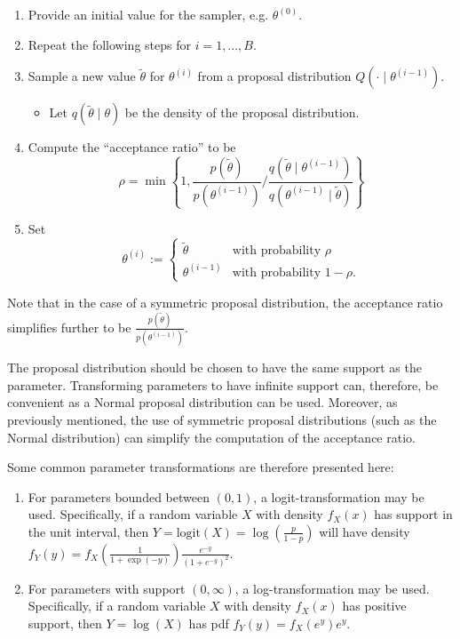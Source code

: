 \documentclass[12pt,]{article}
\providecommand{\tightlist}{%
  \setlength{\itemsep}{0pt}\setlength{\parskip}{0pt}}
\newcommand{\p}[1]{\left(#1\right)}
\newcommand{\bc}[1]{ \left\{#1\right\} }
\def\logit{\text{logit}}
\begin{document}
\begin{enumerate}
\def\labelenumi{\arabic{enumi}.}
\tightlist
\item
  Provide an initial value for the sampler, e.g. \(\theta^{(0)}\).
\item
  Repeat the following steps for \(i = 1,...,B\).
\item
  Sample a new value \(\tilde\theta\) for \(\theta^{(i)}\) from a
  proposal distribution \(Q(\cdot \mid \theta^{(i-1)})\).

  \begin{itemize}
  \tightlist
  \item
    Let \(q(\tilde\theta \mid \theta)\) be the density of the proposal
    distribution.
  \end{itemize}
\item
  Compute the ``acceptance ratio'' to be \[
     \rho=
     \min\bc{1, \frac{p(\tilde\theta)}{p(\theta^{(i-1)})} \Big/ 
            \frac{q(\tilde\theta\mid\theta^{(i-1)})}
                 {q(\theta^{(i-1)}\mid\tilde\theta)}
        }
     \]
\item
  Set \[
     \theta^{(i)} := 
     \begin{cases}
     \tilde\theta &\text{with probability } \rho \\
     \theta^{(i-1)} &\text{with probability } 1-\rho.
     \end{cases}
     \]
\end{enumerate}

Note that in the case of a symmetric proposal distribution, the
acceptance ratio simplifies further to be
\(\frac{p(\tilde\theta)}{p(\theta^{(i-1)})}\).

The proposal distribution should be chosen to have the same support as
the parameter. Transforming parameters to have infinite support can,
therefore, be convenient as a Normal proposal distribution can be used.
Moreover, as previously mentioned, the use of symmetric proposal
distributions (such as the Normal distribution) can simplify the
computation of the acceptance ratio.

Some common parameter transformations are therefore presented here:

\begin{enumerate}
\def\labelenumi{\arabic{enumi}.}
\tightlist
\item
  For parameters bounded between \((0,1)\), a logit-transformation may
  be used. Specifically, if a random variable \(X\) with density
  \(f_X(x)\) has support in the unit interval, then
  \(Y=\logit(X)=\log\p{\frac{p}{1-p}}\) will have density
  \(f_Y(y) = f_X\p{\frac{1}{1+\exp(-y)}}\frac{e^{-y}}{(1+e^{-y})^{2}}\).
\item
  For parameters with support \((0,\infty)\), a log-transformation may
  be used. Specifically, if a random variable \(X\) with density
  \(f_X(x)\) has positive support, then \(Y = \log(X)\) has pdf
  \(f_Y(y) = f_X(e^y) e^y\).
\end{enumerate}
\end{document}
